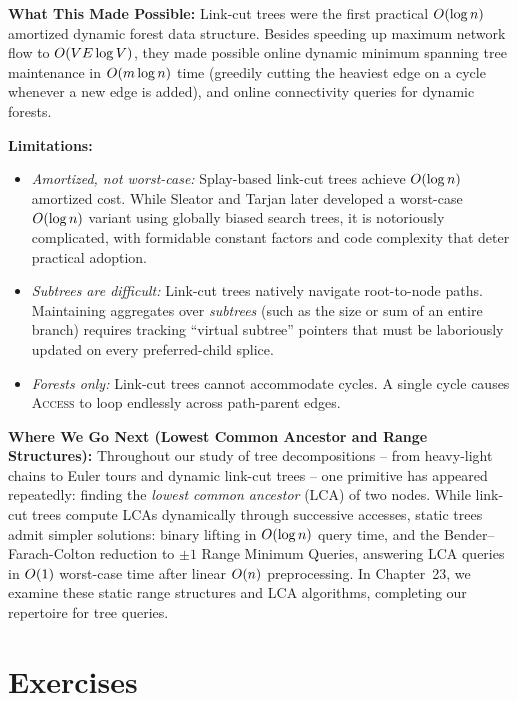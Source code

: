 \begin{connectionbox}
\textbf{What This Made Possible:}
Link-cut trees were the first practical $O(\log n)$ amortized dynamic forest
data structure. Besides speeding up maximum network flow to $O(V E \log V)$, they
made possible online dynamic minimum spanning tree maintenance in $O(m \log n)$ time
(greedily cutting the heaviest edge on a cycle whenever a new edge is added),
and online connectivity queries for dynamic forests.

\textbf{Limitations:}
\begin{itemize}
  \item \emph{Amortized, not worst-case:} Splay-based link-cut trees achieve $O(\log n)$
        amortized cost. While Sleator and Tarjan later developed a worst-case $O(\log n)$
        variant using globally biased search trees, it is notoriously complicated, with
        formidable constant factors and code complexity that deter practical adoption.
  \item \emph{Subtrees are difficult:} Link-cut trees natively navigate root-to-node
        paths. Maintaining aggregates over \emph{subtrees} (such as the size or sum of
        an entire branch) requires tracking ``virtual subtree'' pointers that must be
        laboriously updated on every preferred-child splice.
  \item \emph{Forests only:} Link-cut trees cannot accommodate cycles. A single cycle
        causes \textsc{Access} to loop endlessly across path-parent edges.
\end{itemize}

\textbf{Where We Go Next (Lowest Common Ancestor and Range Structures):}
Throughout our study of tree decompositions -- from heavy-light chains to Euler tours and dynamic link-cut trees -- one primitive has appeared repeatedly: finding the \emph{lowest common ancestor} (LCA) of two nodes. While link-cut trees compute LCAs dynamically through successive accesses, static trees admit simpler solutions: binary lifting in $O(\log n)$ query time, and the Bender--Farach-Colton reduction to $\pm 1$ Range Minimum Queries, answering LCA queries in $O(1)$ worst-case time after linear $O(n)$ preprocessing. In Chapter~23, we examine these static range structures and LCA algorithms, completing our repertoire for tree queries.
\end{connectionbox}

\section{Exercises}
\label{ch22:exercises}

